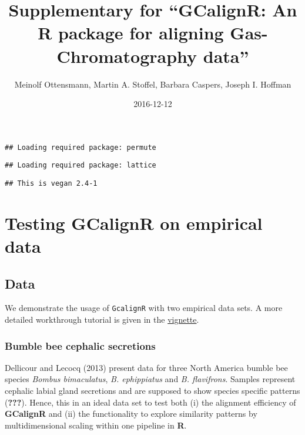 \documentclass[]{article}
\title{Supplementary for ``GCalignR: An R package for aligning
Gas-Chromatography data''}
\author{Meinolf Ottensmann, Martin A. Stoffel, Barbara Caspers, Joseph I.
Hoffman}
\date{2016-12-12}
\newenvironment{Shaded}{}{}
\newcommand{\KeywordTok}[1]{\textbf{{#1}}}
\newcommand{\DataTypeTok}[1]{\textcolor[rgb]{0.50,0.00,0.00}{{#1}}}
\newcommand{\StringTok}[1]{\textcolor[rgb]{0.87,0.00,0.00}{{#1}}}
\newcommand{\CommentTok}[1]{\textcolor[rgb]{0.50,0.50,0.50}{\textit{{#1}}}}
\newcommand{\NormalTok}[1]{{#1}}
\begin{document}
\maketitle

\begin{verbatim}
## Loading required package: permute
\end{verbatim}

\begin{verbatim}
## Loading required package: lattice
\end{verbatim}

\begin{verbatim}
## This is vegan 2.4-1
\end{verbatim}

\section{Testing GCalignR on empirical
data}\label{testing-gcalignr-on-empirical-data}

\subsection{Data}\label{data}

We demonstrate the usage of \texttt{GcalignR} with two empirical data
sets. A more detailed workthrough tutorial is given in the
\href{../doc/GCalignR_step_by_step.html}{vignette}.

\subsubsection{Bumble bee cephalic
secretions}\label{bumble-bee-cephalic-secretions}

Dellicour and Lecocq (2013) present data for three North America bumble
bee species \emph{Bombus bimaculatus}, \emph{B. ephippiatus} and
\emph{B. flavifrons}. Samples represent cephalic labial gland secretions
and are supposed to show species specific patterns ({\textbf{???}}).
Hence, this in an ideal data set to test both (i) the alignment
efficiency of \textbf{GCalignR} and (ii) the functionality to explore
similarity patterns by multidimensional scaling within one pipeline in
\textbf{R}.

\begin{Shaded}
\end{Shaded}
\end{document}
